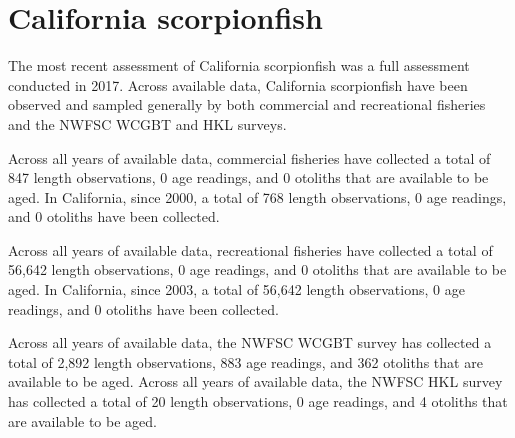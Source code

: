 \documentclass[11pt,
  english,
  letterpaper,
]{article}
\begin{document}

\hypertarget{california-scorpionfish}{%
\section{California scorpionfish}\label{california-scorpionfish}}

\leavevmode\tagmcend\tagstructend


The most recent assessment of California scorpionfish was a full assessment conducted in 2017. Across available data, California scorpionfish have been observed and sampled generally by both commercial and recreational fisheries and the NWFSC WCGBT and HKL surveys.

\leavevmode\tagmcend\tagstructend\par


Across all years of available data, commercial fisheries have collected a total of 847 length observations, 0 age readings, and 0 otoliths that are available to be aged. In California, since 2000, a total of 768 length observations, 0 age readings, and 0 otoliths have been collected.

\leavevmode\tagmcend\tagstructend\par


Across all years of available data, recreational fisheries have collected a total of 56,642 length observations, 0 age readings, and 0 otoliths that are available to be aged. In California, since 2003, a total of 56,642 length observations, 0 age readings, and 0 otoliths have been collected.

\leavevmode\tagmcend\tagstructend\par


Across all years of available data, the NWFSC WCGBT survey has collected a total of 2,892 length observations, 883 age readings, and 362 otoliths that are available to be aged. Across all years of available data, the NWFSC HKL survey has collected a total of 20 length observations, 0 age readings, and 4 otoliths that are available to be aged.

\leavevmode\tagmcend\tagstructend\par
\end{document}

